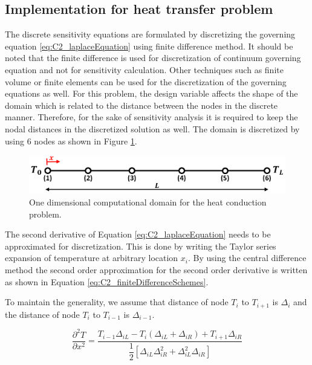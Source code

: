 \subsection{Implementation for heat transfer problem}
The discrete sensitivity equations are formulated by discretizing the governing equation \eqref{eq:C2_laplaceEquation} using finite difference method. It should be noted that the finite difference is used for discretization of continuum governing equation and not for sensitivity calculation. Other techniques such as finite volume or finite elements can be used for the discretization of the governing equations as well. For this problem, the design variable affects the shape of the domain which is related to the distance between the nodes in the discrete manner. Therefore, for the sake of sensitivity analysis it is required to keep the nodal distances in the discretized solution as well. The domain is discretized by using 6 nodes as shown in Figure \ref{fig:C2_discretizedDomain}.

\begin{figure}[h]
	\centering
	\includegraphics[width=14.00cm]{Chapter_2/figure/benchmark_case_computational_domain.png}
	\caption{One dimensional computational domain for the heat conduction problem.}
	\label{fig:C2_discretizedDomain}
\end{figure}

The second derivative of Equation \eqref{eq:C2_laplaceEquation} needs to be approximated for discretization. This is done by writing the Taylor series expansion of temperature at arbitrary location $x_i$. By using the central difference method the second order approximation for the second order derivative is written as shown in Equation \eqref{eq:C2_finiteDifferenceSchemes}.

To maintain the generality, we assume that distance of node $T_i$ to $T_{i+1}$ is $\Delta_i$ and the distance of node $T_i$ to $T_{i-1}$ is $\Delta_{i-1}$.

\begin{equation}\label{eq:C2_finiteDifferenceSchemes}
	\frac{\partial^2 T}{\partial x^2} = 
	\frac{T_{i-1} \Delta_{iL} - 
	      T_{i} (\Delta_{iL} + \Delta_{iR}) + 
	      T_{i+1} \Delta_{iR}}
	     {\dfrac{1}{2} \left[ \Delta_{iL} \Delta_{iR}^2 + 
	                         \Delta_{iL}^2 \Delta_{iR} \right]}
\end{equation}

